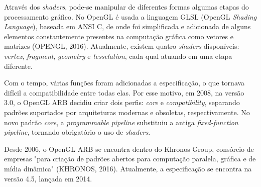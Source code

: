 Através dos \textit{shaders}, pode-se manipular de diferentes formas algumas etapas do processamento gráfico. No OpenGL é usada a linguagem GLSL (OpenGL \textit{Shading Language}), baseada em ANSI C, de onde foi simplificada e adicionada de alguns elementos constantemente presentes na computação gráfica como vetores e matrizes (OPENGL, 2016). Atualmente, existem quatro \textit{shaders} disponíveis: \textit{vertex}, \textit{fragment}, \textit{geometry} e \textit{tesselation}, cada qual atuando em uma etapa diferente.

Com o tempo, várias funções foram adicionadas a especificação, o que tornava difícil a compatibilidade entre todas elas. Por esse motivo, em 2008, na versão 3.0, o OpenGL ARB decidiu criar dois perfis: \textit{core} e \textit{compatibility}, separando padrões suportados por arquiteturas modernas e obsoletas, respectivamente. No novo padrão \textit{core}, a \textit{programmable pipeline} substituiu a antiga \textit{fixed-function pipeline}, tornando obrigatório o uso de \textit{shaders}.

Desde 2006, o OpenGL ARB se encontra dentro do Khronos Group, consórcio de empresas "para criação de padrões abertos para computação paralela, gráfica e de mídia dinâmica" (KHRONOS, 2016). Atualmente, a especificação se encontra na versão 4.5, lançada em 2014.